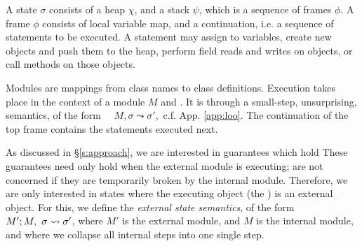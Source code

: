 A \Loo state $\sigma$ consists of a 
heap $\chi$, and a  {stack $\psi$, which is a sequence of frames $\phi$}.
A frame $\phi$ consists of
local variable map, and a continuation, i.e. a sequence of statements to be executed.
 A statement may assign to variables, create new objects and push them to the heap, 
perform field reads and writes on objects,  or
 call methods on those objects. 

 Modules are mappings
from class names to class definitions. 
Execution takes place in the context of  a module $M$ and   .
It is %
  through a small-step, unsurprising, semantics, of the form \ \ 
   $M, \sigma \leadsto \sigma'$,\  c.f. App. \ref{app:loo}.
The   continuation of the top frame contains the statements  %
executed next.
 
As discussed in \S \ref{s:approach}, we are interested in guarantees which hold
 These guarantees need only hold 
when the external module is executing; \scd{we} are not concerned if they are
temporarily broken by the internal module. Therefore, we are only interested in states where the
executing object (the \prg{this}) is an external object. 
For this, we define the  \emph{external state semantics}, of the form 
$M' ; M,\ \sigma \leadsto \sigma'$, where $M'$ is the external
module, and $M$ is the internal module, and where we
collapse all internal steps into one single step.

 

